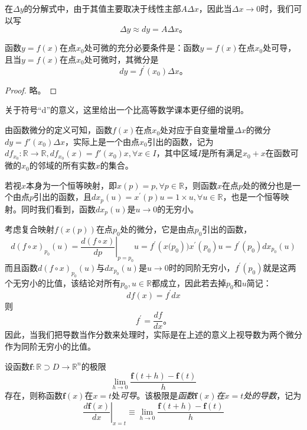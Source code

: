 \documentclass[main.tex]{subfiles}
\begin{document}
在$\Delta y$的分解式中，由于其值主要取决于线性主部$A\Delta x$，因此当$\Delta x\to 0$时，我们可以写
\[
    \Delta y\approx dy=A\Delta x\text{。}
\]

\begin{theorem}\label{thm:II.4.5}\cite[定理2.5.1]{华工高数2009上}
    函数$y=f\left(x\right)$在点$x_0$处可微的充分必要条件是：函数$y=f\left(x\right)$在点$x_0$处可导，且当$y=f\left(x\right)$在点$x_0$处可微时，其微分是
    \[
        dy=f^\prime\left(x_0\right)\Delta x\text{。}
    \]
\end{theorem}
\begin{proof}
    略\cite[p.~103]{华工高数2009上}。
\end{proof}

关于符号“d”的意义，这里给出一个比高等数学课本\cite[p.~104]{华工高数2009上}更仔细的说明。

由函数微分的定义可知，函数$f\left(x\right)$在点$x_0$处对应于自变量增量$\Delta x$的微分$dy=f'\left(x_0\right)\Delta x$，实际上是一个由点$x_0$引出的函数，记为$df_{x_0}:\mathbb{R}\rightarrow\mathbb{R},df_{x_0}\left(x\right)=f'\left(x_0\right)x,\forall x\in I$，其中区域$I$是所有满足$x_0+x$在函数可微的$x_0$的邻域的所有实数$x$的集合。

若视$x$本身为一个恒等映射，即$x\left(p\right)=p,\forall p\in\mathbb{R}$，则函数$x$在点$p$处的微分也是一个由点$p$引出的函数，且$dx_p\left(u\right)=x^\prime\left(p\right) u=1\times u,\forall u\in\mathbb{R}$，也是一个恒等映射。同时我们看到，函数$dx_p\left(u\right)$是$u\to 0$的无穷小。

考虑复合映射$f\left(x\left(p\right)\right)$在点$p_0$处的微分，它是由点$p_0$引出的函数，\[d\left(f\circ x\right)_{p_0}\left(u\right)=\left.\frac{d\left(f\circ x\right)}{dp}\right|_{p=p_0}u=f^\prime\left(x(p_0\right))x^\prime\left(p_0\right)u=f^\prime\left(p_0\right)dx_{p_0}\left(u\right)\]
而且函数$d\left(f\circ x\right)_{p_0}\left(u\right)$与$dx_{p_0}\left(u\right)$是$u\to 0$时的同阶无穷小，$f^\prime\left(p_0\right)$就是这两个无穷小的比值，该结论对所有$p_0,u\in\mathbb{R}$都成立，因此若去掉$p_0$和$u$简记：
\[df\left(x\right)=f^\prime dx\]
则
\[f^\prime=\frac{df}{dx}\text{。}\]
因此，当我们把导数当作分数来处理时，实际是在上述的意义上视导数为两个微分作为同阶无穷小的比值。

\begin{definition}[一元向量函数的导数]\label{def:II.4.9}
    设函数$\mathbf{f}:\mathbb{R}\supset D\rightarrow\mathbb{R}^n$的极限
    \[
        \lim_{h\to 0}\frac{\mathbf{f}\left(t+h\right)-\mathbf{f}\left(t\right)}{h}
    \]
    存在，则称函数$\mathbf{f}\left(x\right)$在$x=t$处\emph{可导}。该极限是\emph{函数$\mathbf{f}\left(x\right)$在$x=t$处的导数}，记为
    \[
        \left.\frac{d\mathbf{f}\left(x\right)}{dx}\right|_{x=t}\equiv\lim_{h\to 0}\frac{\mathbf{f}\left(t+h\right)-\mathbf{f}\left(t\right)}{h}
    \]
\end{definition}
\end{document}
